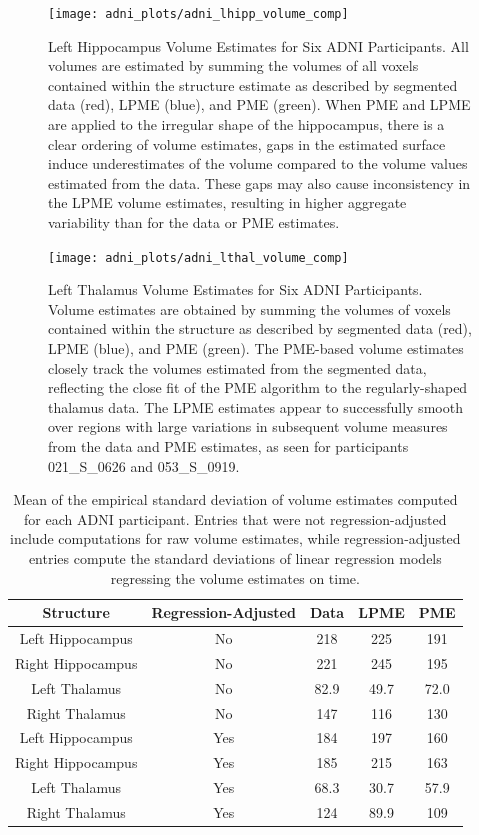 \documentclass[11pt,reqno]{article}
\theoremstyle{definition}
\begin{document}
\begin{figure}[h]
  \centering
  \texttt{[image: adni\_plots/adni\_lhipp\_volume\_comp]}
  \caption{Left Hippocampus Volume Estimates for Six ADNI Participants. All volumes are estimated by summing the volumes of all voxels contained within the structure estimate as described by segmented data (red), LPME (blue), and PME (green). When PME and LPME are applied to the irregular shape of the hippocampus, there is a clear ordering of volume estimates, gaps in the estimated surface induce underestimates of the volume compared to the volume values estimated from the data. These gaps may also cause inconsistency in the LPME volume estimates, resulting in higher aggregate variability than for the data or PME estimates.}
  \label{fig:lhipp_volume_comparison}
\end{figure}

\begin{figure}[h]
  \centering
  \texttt{[image: adni\_plots/adni\_lthal\_volume\_comp]}
  \caption{Left Thalamus Volume Estimates for Six ADNI Participants. Volume estimates are obtained by summing the volumes of voxels contained within the structure as described by segmented data (red), LPME (blue), and PME (green). The PME-based volume estimates closely track the volumes estimated from the segmented data, reflecting the close fit of the PME algorithm to the regularly-shaped thalamus data. The LPME estimates appear to successfully smooth over regions with large variations in subsequent volume measures from the data and PME estimates, as seen for participants 021\_S\_0626 and 053\_S\_0919.}
  \label{fig:lthal_volume_comparison}
\end{figure}


\begin{table}[ht]
  \centering
  \begin{tabular}{|c c c c c|}
    \hline
    Structure & Regression-Adjusted & Data & LPME & PME  \\
    \hline
    Left Hippocampus & No & 218 & 225 & 191 \\
    Right Hippocampus & No & 221 & 245 & 195 \\
    Left Thalamus & No & 82.9 & 49.7 & 72.0 \\
    Right Thalamus & No & 147 & 116 & 130 \\
    Left Hippocampus & Yes & 184 & 197 & 160 \\
    Right Hippocampus & Yes & 185 & 215 & 163 \\
    Left Thalamus & Yes & 68.3 & 30.7 & 57.9 \\
    Right Thalamus & Yes & 124 & 89.9 & 109 \\
    \hline
  \end{tabular}
  \caption{Mean of the empirical standard deviation of volume estimates computed for each ADNI participant. Entries that were not regression-adjusted include computations for raw volume estimates, while regression-adjusted entries compute the standard deviations of linear regression models regressing the volume estimates on time.}
  \label{table:adni_volume_sds}
\end{table}
\end{document}
